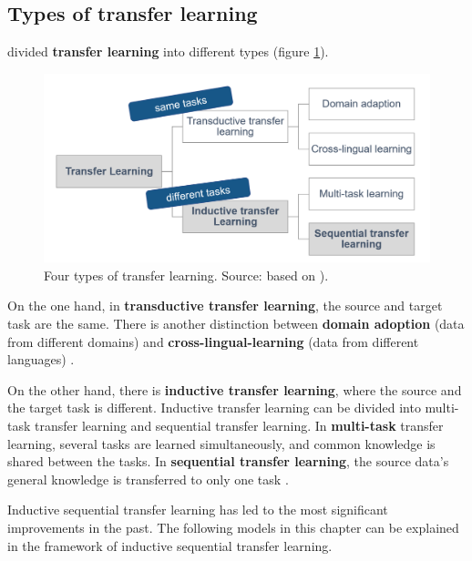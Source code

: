 \documentclass[]{krantz}
\begin{document}
\hypertarget{types-of-transfer-learning}{%
\subsection{Types of transfer learning}\label{types-of-transfer-learning}}

\citet{panandyoung2010} divided \textbf{transfer learning} into different types (figure \ref{fig:ch21-typesoftransferlearning}).



\begin{figure}

{\centering \includegraphics[width=0.75\linewidth]{figures/02-01-transfer-learning-for-nlp-1/types-of-transfer-learning} 

}

\caption{Four types of transfer learning. Source: based on \citep{Ruder2019}).}\label{fig:ch21-typesoftransferlearning}
\end{figure}

On the one hand, in \textbf{transductive transfer learning}, the source and target task are the same. There is another distinction between \textbf{domain adoption} (data from different domains) and \textbf{cross-lingual-learning} (data from different languages) \citep{Ruder2019}.

On the other hand, there is \textbf{inductive transfer learning}, where the source and the target task is different. Inductive transfer learning can be divided into multi-task transfer learning and sequential transfer learning. In \textbf{multi-task} transfer learning, several tasks are learned simultaneously, and common knowledge is shared between the tasks. In \textbf{sequential transfer learning}, the source data's general knowledge is transferred to only one task \citep{Ruder2019}.

Inductive sequential transfer learning has led to the most significant improvements in the past. The following models in this chapter can be explained in the framework of inductive sequential transfer learning.
\end{document}
